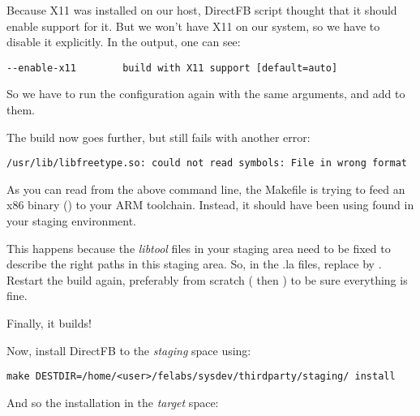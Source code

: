Because X11 was installed on our host, DirectFB 
script thought that it should enable support for it. But we won't have
X11 on our system, so we have to disable it explicitly. In the
 output, one can see:

\begin{verbatim}
--enable-x11		build with X11 support [default=auto]
\end{verbatim}

So we have to run the configuration again with the same arguments, and
add  to them.

The build now goes further, but still fails with another error:

\begin{verbatim}
/usr/lib/libfreetype.so: could not read symbols: File in wrong format
\end{verbatim}

As you can read from the above command line, the Makefile is trying to
feed an x86 binary () to your ARM
toolchain. Instead, it should have been using
 found in your staging environment.

This happens because the {\em libtool}  files in your
staging area need to be fixed to describe the right paths in this
staging area. So, in the .la files, replace 
by
. Restart
the build again, preferably from scratch ( then
) to be sure everything is fine.

Finally, it builds!

Now, install DirectFB to the {\em staging} space using:

\begin{verbatim}
make DESTDIR=/home/<user>/felabs/sysdev/thirdparty/staging/ install
\end{verbatim}

And so the installation in the {\em target} space:

